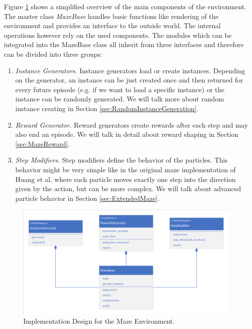 Figure \ref{fig:MazeBaseDesign} shows a simplified overview of the main components of the environment. The master class \textit{MazeBase} handles basic functions like rendering of the environment and provides an interface to the outside world. The internal operations however rely on the used components. The modules which can be integrated into the MazeBase class all inherit from three interfaces and therefore can be divided into three groups:

\begin{enumerate}
    \item \textit{Instance Generators.} Instance generators load or create instances. Depending on the generator, an instance can be just created once and then returned for every future episode (e.g. if we want to load a specific instance) or the instance can be randomly generated. We will talk more about random instance creating in Section \ref{sec:RandomInstanceGeneration}.
    \item \textit{Reward Generator.} Reward generators create rewards after each step and may also end an episode. We will talk in detail about reward shaping in Section \ref{sec:MazeReward}.
    \item \textit{Step Modifiers.} Step modifiers define the behavior of the particles. This behavior might be very simple like in the original maze implementation of Huang et al. where each particle moves exactly one step into the direction given by the action, but can be more complex. We will talk about advanced particle behavior in Section \ref{sec:ExtendedMaze}. 
\end{enumerate}

\begin{figure}[ht]
    
    \begin{center}
        \includegraphics[clip, trim=10px 10px 10px 10px, width=0.9\columnwidth]{figures/implementation/maze_base_design.pdf}
    \end{center}
    
    \caption[Implementation Design for the Maze Environment]{Implementation Design for the Maze Environment.}
    \label{fig:MazeBaseDesign}
  \end{figure}

